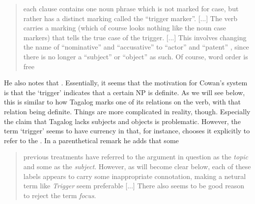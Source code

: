 \blockcquote{cowan1995}{each clause contains one noun phrase which is not
marked for case, but rather has a distinct marking called the \enquote{trigger
marker}. [...] The verb carries a marking (which of course looks nothing like
the noun case markers) that tells the true case of the trigger.
% 
%
[...]
%
This involves changing the name of \enquote{nominative} and
\enquote{accusative} to \enquote{actor} and \enquote{patent} \sic{}, since
there is no longer a \enquote{subject} or \enquote{object} as such. Of course,
word order is free
% 
}

He also notes that . Essentially, it seems that the motivation for
Cowan's system is that the `trigger' indicates that a certain NP is definite.
As we will see below, this is similar to how Tagalog marks one of its relations
on the verb, with that relation being definite. Things are more complicated in
reality, though. Especially the claim that Tagalog lacks subjects and objects
is problematic. However, the term `trigger' seems to have currency in that, for
instance, \citet{schachter2015} chooses it explicitly to refer to the
. In a parenthetical
remark he adds that some

\blockcquote[1659]{schachter2015}{previous treatments have referred to the
argument in question as the \emph{topic} and some as the \emph{subject}.
However, as will become clear below, each of these labels appears to carry some
inappropriate connotation, making a netural term like \emph{Trigger} seem
preferable [...] There also seems to be good reason to reject the term
\emph{focus}.}


